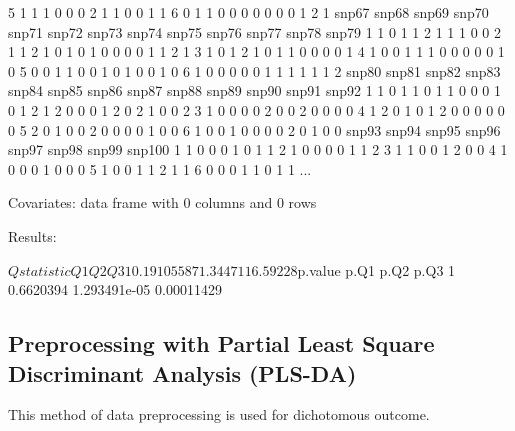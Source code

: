 \documentclass{article}
\begin{document}
\begin{Schunk}
\begin{Soutput}
5     1     1     1     0     0     0     2     1     1     0     0     1     1
6     0     1     1     0     0     0     0     0     0     0     1     2     1
  snp67 snp68 snp69 snp70 snp71 snp72 snp73 snp74 snp75 snp76 snp77 snp78 snp79
1     1     0     1     1     2     1     1     1     0     0     2     1     1
2     1     0     1     0     1     0     0     0     0     1     1     2     1
3     1     0     1     2     1     0     1     1     0     0     0     0     1
4     1     0     0     1     1     1     0     0     0     0     0     1     0
5     0     0     1     1     0     0     1     0     1     0     0     1     0
6     1     0     0     0     0     0     1     1     1     1     1     1     2
  snp80 snp81 snp82 snp83 snp84 snp85 snp86 snp87 snp88 snp89 snp90 snp91 snp92
1     1     0     1     1     0     1     1     0     0     0     1     0     1
2     1     2     0     0     0     1     2     0     2     1     0     0     2
3     1     0     0     0     0     2     0     0     2     0     0     0     0
4     1     2     0     1     0     1     2     0     0     0     0     0     0
5     2     0     1     0     0     2     0     0     0     0     1     0     0
6     1     0     0     1     0     0     0     0     2     0     1     0     0
  snp93 snp94 snp95 snp96 snp97 snp98 snp99 snp100
1     1     0     0     0     1     0     1      1
2     1     0     0     0     0     1     1      2
3     1     1     0     0     1     2     0      0
4     1     0     0     0     1     0     0      0
5     1     0     0     1     1     2     1      1
6     0     0     0     1     1     0     1      1
...

Covariates:
data frame with 0 columns and 0 rows


Results:

$Qstatistic
         Q1       Q2       Q3
1 0.1910558 71.34471 16.59228

$p.value
       p.Q1         p.Q2       p.Q3
1 0.6620394 1.293491e-05 0.00011429
\end{Soutput}
\end{Schunk}

\subsection{Preprocessing with Partial Least Square Discriminant Analysis (PLS-DA)}

This method of data preprocessing is used for dichotomous outcome.
\end{document}
